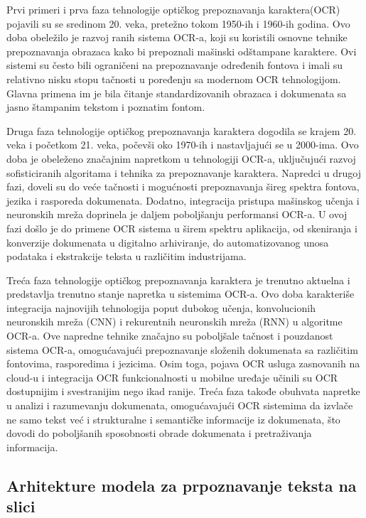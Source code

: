 \documentclass[a4paper,12pt]{article}
\begin{document}
	Prvi primeri i prva faza tehnologije optičkog prepoznavanja karaktera(OCR) pojavili su se sredinom 20. veka, pretežno tokom 1950-ih i 1960-ih godina. Ovo doba obeležilo je razvoj ranih sistema OCR-a, koji su koristili osnovne tehnike prepoznavanja obrazaca kako bi prepoznali mašinski odštampane karaktere. Ovi sistemi su često bili ograničeni na prepoznavanje određenih fontova i imali su relativno nisku stopu tačnosti u poređenju sa modernom OCR tehnologijom. Glavna primena im je bila čitanje standardizovanih obrazaca i dokumenata sa jasno štampanim tekstom i poznatim fontom.
	
	Druga faza tehnologije optičkog prepoznavanja karaktera dogodila se krajem 20. veka i početkom 21. veka, počevši oko 1970-ih i nastavljajući se u 2000-ima. Ovo doba je obeleženo značajnim napretkom u tehnologiji OCR-a, uključujući razvoj sofisticiranih algoritama i tehnika za prepoznavanje karaktera. Napredci u drugoj fazi, doveli su do veće tačnosti i mogućnosti prepoznavanja šireg spektra fontova, jezika i rasporeda dokumenata. Dodatno, integracija pristupa mašinskog učenja i neuronskih mreža doprinela je daljem poboljšanju performansi OCR-a. U ovoj fazi došlo je do primene OCR sistema u širem spektru aplikacija, od skeniranja i konverzije dokumenata u digitalno arhiviranje, do automatizovanog unosa podataka i ekstrakcije teksta u različitim industrijama.
	
	Treća faza tehnologije optičkog prepoznavanja karaktera je trenutno aktuelna i predstavlja trenutno stanje napretka u sistemima OCR-a. Ovo doba karakteriše integracija najnovijih tehnologija poput dubokog učenja, konvolucionih neuronskih mreža (CNN) i rekurentnih neuronskih mreža (RNN) u algoritme OCR-a. Ove napredne tehnike značajno su poboljšale tačnost i pouzdanost sistema OCR-a, omogućavajući prepoznavanje složenih dokumenata sa različitim fontovima, rasporedima i jezicima. Osim toga, pojava OCR usluga zasnovanih na cloud-u i integracija OCR funkcionalnosti u mobilne uređaje učinili su OCR dostupnijim i svestranijim nego ikad ranije. Treća faza takođe obuhvata napretke u analizi i razumevanju dokumenata, omogućavajući OCR sistemima da izvlače ne samo tekst već i strukturalne i semantičke informacije iz dokumenata, što dovodi do poboljšanih sposobnosti obrade dokumenata i pretraživanja informacija.
	
	\subsection{Arhitekture modela za prpoznavanje teksta na slici}
	
\end{document}
